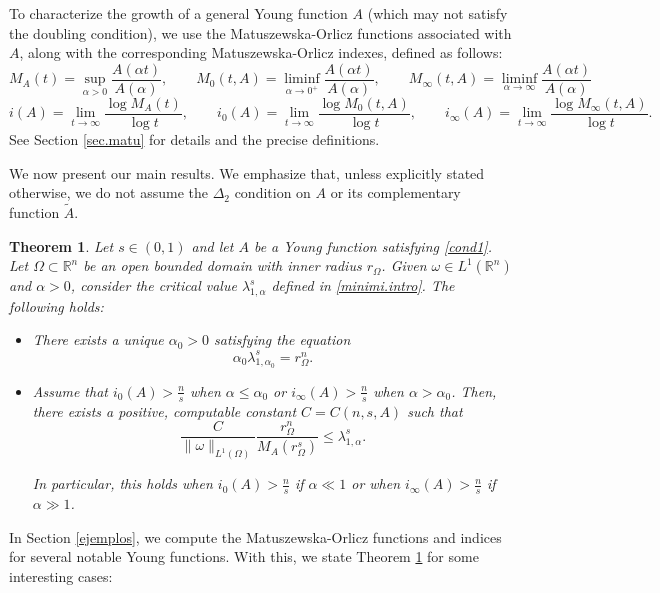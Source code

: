 \documentclass[12pt,reqno]{amsart}
\newtheorem{thm}{Theorem}[section]
\theoremstyle{definition}
\theoremstyle{remark}
\numberwithin{equation}{section}
\begin{document}
To characterize  the growth of a general Young function $A $  (which may not satisfy the doubling condition), we use the Matuszewska-Orlicz functions associated with $A$, along with the corresponding Matuszewska-Orlicz indexes, defined as follows:
$$
M_A(t)=\sup_{\alpha>0} \frac{A(\alpha t)}{A(\alpha)}, \qquad M_0(t,A)=\liminf_{\alpha\to 0^+} \frac{A(\alpha t)}{A(\alpha)},\qquad 
M_\infty(t,A)=\liminf_{\alpha\to\infty} \frac{A(\alpha t)}{A(\alpha)}
$$
$$
i (A)= \lim_{t\to\infty} \frac{\log M_A (t)}{\log t}, \qquad i_0 (A)= \lim_{t\to\infty} \frac{\log M_0 (t,A)}{\log t}, \qquad i_\infty (A)= \lim_{t\to\infty} \frac{\log M_\infty (t,A)}{\log t}.
$$
See Section \ref{sec.matu} for details and the precise definitions.

\medskip
We now present our main results. We emphasize that, unless explicitly stated otherwise, we do not assume the $\Delta_2$ condition on $A$ or its complementary function $\tilde A$.


\begin{thm}  \label{teo1.intro}
Let $s\in (0,1)$ and let $A$ be a Young function satisfying \eqref{cond1}. Let $\Omega\subset \mathbb{R}^n$ be an open bounded domain with inner radius $r_\Omega$. Given  $\omega\in L^1(\mathbb{R}^n)$ and $\alpha>0$, consider the critical value $\lambda_{1,\alpha}^s$ defined in \eqref{minimi.intro}. The following holds:
\begin{itemize}
\item[i)] There exists a unique $\alpha_0>0$ satisfying the equation
$$
\alpha_0 \lambda_{1,\alpha_0}^s = r_\Omega^n.
$$

\item[ii)] 
Assume that $i_0(A)>\frac{n}{s}$ when $\alpha\leq \alpha_0$ or $i_\infty(A) >\frac{n}{s}$ when $\alpha> \alpha_0$. Then, there exists a positive, computable constant $C=C(n,s,A)$ such that
\begin{equation*} %
\frac{C}{\|\omega\|_{L^1(\Omega)}} \frac{r_\Omega^n}{M_A(r_\Omega^s)} \le \lambda_{1,\alpha}^s.
\end{equation*}


\noindent In particular, this holds when $i_0(A)>\frac{n}{s}$ if $\alpha\ll1$ or when $i_\infty(A) >\frac{n}{s}$ if $\alpha\gg1$.
\end{itemize}

\end{thm}
 
In Section \ref{ejemplos}, we compute the Matuszewska-Orlicz functions and indices for several notable Young functions. With this,  we state Theorem \ref{teo1.intro} for some interesting cases:
\end{document}

